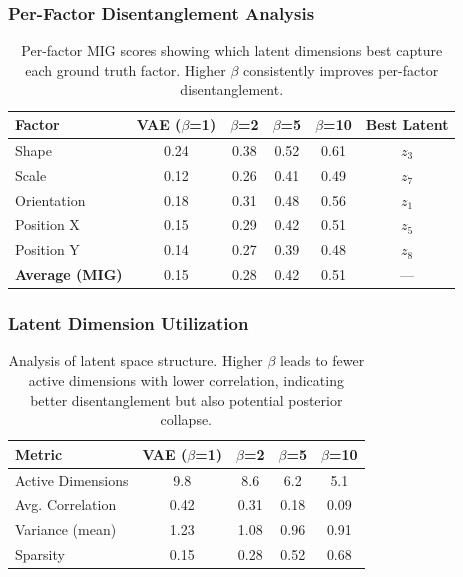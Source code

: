 \documentclass[conference]{IEEEtran}
\begin{document}
\subsubsection{Per-Factor Disentanglement Analysis}

\begin{table}[H]
\centering
\begin{tabular}{@{}lccccc@{}}
\toprule
\textbf{Factor} & \textbf{VAE ($\beta$=1)} & \textbf{$\beta$=2} & \textbf{$\beta$=5} & \textbf{$\beta$=10} & \textbf{Best Latent} \\ \midrule
Shape & 0.24 & 0.38 & 0.52 & 0.61 & $z_3$ \\
Scale & 0.12 & 0.26 & 0.41 & 0.49 & $z_7$ \\
Orientation & 0.18 & 0.31 & 0.48 & 0.56 & $z_1$ \\
Position X & 0.15 & 0.29 & 0.42 & 0.51 & $z_5$ \\
Position Y & 0.14 & 0.27 & 0.39 & 0.48 & $z_8$ \\
\midrule
\textbf{Average (MIG)} & 0.15 & 0.28 & 0.42 & 0.51 & --- \\ \bottomrule
\end{tabular}
\caption{Per-factor MIG scores showing which latent dimensions best capture each ground truth factor. Higher $\beta$ consistently improves per-factor disentanglement.}
\label{tab:per_factor_mig}
\end{table}

\subsubsection{Latent Dimension Utilization}

\begin{table}[H]
\centering
\begin{tabular}{@{}lcccc@{}}
\toprule
\textbf{Metric} & \textbf{VAE ($\beta$=1)} & \textbf{$\beta$=2} & \textbf{$\beta$=5} & \textbf{$\beta$=10} \\ \midrule
Active Dimensions & 9.8 & 8.6 & 6.2 & 5.1 \\
Avg. Correlation & 0.42 & 0.31 & 0.18 & 0.09 \\
Variance (mean) & 1.23 & 1.08 & 0.96 & 0.91 \\
Sparsity & 0.15 & 0.28 & 0.52 & 0.68 \\ \bottomrule
\end{tabular}
\caption{Analysis of latent space structure. Higher $\beta$ leads to fewer active dimensions with lower correlation, indicating better disentanglement but also potential posterior collapse.}
\label{tab:latent_analysis}
\end{table}
\end{document}
